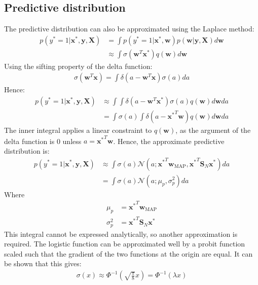 \documentclass[a4paper]{article}
\begin{document}
    \subsection{Predictive distribution}
    The predictive distribution can also be approximated using the Laplace method:
    \begin{align}
        p(y^* = 1 | \bm{x}^*, \bm{y}, \bm{X}) &= \int p(y^* = 1 | \bm{x}^*, \bm{w}) p(\bm{w} | \bm{y}, \bm{X}) d\bm{w} \nonumber \\
        & \approx \int \sigma(\bm{w}^T\bm{x}^*) q(\bm{w}) d\bm{w}
    \end{align}
    Using the sifting property of the delta function:
    \begin{align}
        \sigma(\bm{w}^T \bm{x}) = \int \delta(a - \bm{w}^T \bm{x}) \sigma(a) da
    \end{align}
    Hence:
     \begin{align}
        p(y^* = 1 | \bm{x}^*, \bm{y}, \bm{X}) &\approx \int \int \delta(a - \bm{w}^T \bm{x}^*) \sigma(a) q(\bm{w}) d\bm{w} da \nonumber \\
         &= \int \sigma(a) \int \delta(a - {\bm{x}^*}^T \bm{w}) q(\bm{w}) d\bm{w} da \nonumber
    \end{align}
    The inner integral applies a linear constraint to $q(\bm{w})$, as the argument of the delta function is 0 unless $a = {\bm{x}^*}^T \bm{w}$.
    Hence, the approximate predictive distribution is:
    \begin{align}
        \label{eq:approx_predictive}
         p(y^* = 1 | \bm{x}^*, \bm{y}, \bm{X}) &\approx \int \sigma(a) \mathcal{N}(a; {\bm{x}^*}^T \bm{w}_\text{MAP}, {\bm{x}^*}^T \bm{S}_N \bm{x^*}) da \nonumber \\
        &= \int \sigma(a) \mathcal{N}(a; \mu_p, \sigma_p^2) da
     \end{align}
    Where
    \begin{align}
        \mu_p &= {\bm{x}^*}^T \bm{w}_\text{MAP}\\
        \sigma_p^2 &= {\bm{x}^*}^T \bm{S}_N \bm{x^*}
    \end{align}
    This integral cannot be expressed analytically, so another approximation is required.
    The logistic function can be approximated well by a probit function scaled such that the gradient of the two functions at the origin are equal.
    It can be shown that this gives:
    \begin{align}
        \label{eq:probit_approx}
        \sigma(x) \approx \Phi^{-1}\left(\sqrt{\frac{\pi}{8}} x\right) = \Phi^{-1}(\lambda x)
    \end{align}
\end{document}
